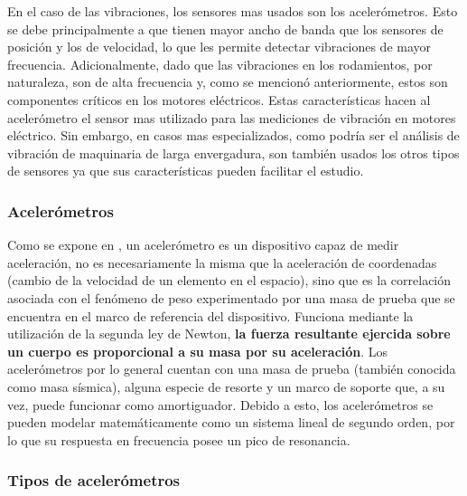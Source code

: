 En el caso de las vibraciones, los sensores mas usados son los
acelerómetros.  Esto se debe principalmente a que tienen mayor ancho de banda
que los sensores de posición y los de velocidad, lo que les permite detectar
vibraciones de mayor frecuencia. Adicionalmente, dado que las vibraciones en los
rodamientos, por naturaleza, son de alta frecuencia y, como se mencionó anteriormente,
estos son componentes críticos en los motores eléctricos.
Estas características hacen al acelerómetro el sensor mas utilizado para las
mediciones de vibración en motores eléctrico. Sin embargo,
en casos mas especializados, como podría ser el análisis de vibración
de maquinaria de larga envergadura, son también usados los otros tipos de
sensores ya que sus características pueden facilitar el estudio.


\subsubsection{Acelerómetros}

Como se expone en \cite{Fraden}, un acelerómetro es un dispositivo capaz de
medir aceleración, no es
necesariamente la misma que la aceleración de coordenadas (cambio de la velocidad de
un elemento en el espacio), sino que es la correlación asociada con el fenómeno
de peso experimentado por una masa de prueba que se
encuentra en el marco de referencia del dispositivo.  Funciona mediante
la utilización de la segunda ley de Newton, \textbf{la fuerza resultante
ejercida sobre un cuerpo es proporcional a su masa por su aceleración}. Los
acelerómetros por lo general cuentan con una masa de prueba (también conocida
como masa sísmica), alguna especie de resorte y un marco de soporte que, a su
vez, puede funcionar como amortiguador. Debido a esto, los acelerómetros se
pueden modelar matemáticamente como un sistema lineal de segundo orden,
por lo que su respuesta en frecuencia posee un pico de resonancia.


\subsubsection*{Tipos de acelerómetros}

